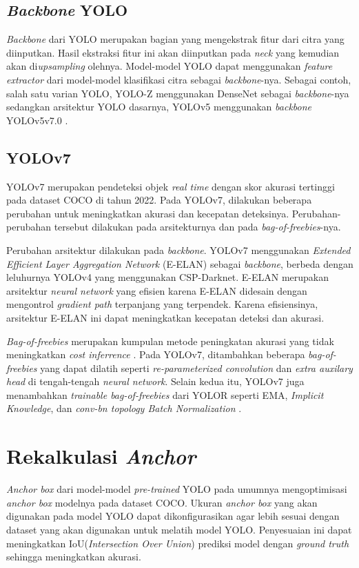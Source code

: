     \subsection{\emph{Backbone} YOLO}
      \emph{Backbone} dari YOLO merupakan bagian yang mengekstrak fitur dari citra yang diinputkan.
      Hasil ekstraksi fitur ini akan diinputkan pada \emph{neck} yang kemudian akan di\emph{upsampling} olehnya.
      Model-model YOLO dapat menggunakan \emph{feature extractor} dari model-model klasifikasi citra sebagai \emph{backbone}-nya.
      Sebagai contoh, salah satu varian YOLO, YOLO-Z menggunakan DenseNet sebagai \emph{backbone}-nya sedangkan arsitektur YOLO dasarnya, YOLOv5 menggunakan \emph{backbone} YOLOv5v7.0 \parencite{yoloz}.
  
  
  
  
  \subsection{YOLOv7}
    YOLOv7 merupakan pendeteksi objek \emph{real time} dengan skor akurasi tertinggi pada dataset COCO di tahun 2022.
    Pada YOLOv7, dilakukan beberapa perubahan untuk meningkatkan akurasi dan kecepatan deteksinya.
    Perubahan-perubahan tersebut dilakukan pada arsitekturnya dan pada \emph{bag-of-freebies}-nya.
  
    Perubahan arsitektur dilakukan pada \emph{backbone}. YOLOv7 menggunakan \emph{Extended Efficient Layer Aggregation Network} (E-ELAN) sebagai \emph{backbone}, berbeda dengan leluhurnya YOLOv4 yang menggunakan CSP-Darknet.
    E-ELAN merupakan arsitektur \emph{neural network} yang efisien karena E-ELAN didesain dengan mengontrol \emph{gradient path} terpanjang yang terpendek.
    Karena efisiensinya, arsitektur E-ELAN ini dapat meningkatkan kecepatan deteksi dan akurasi. \parencite{yolov7}
  
    \emph{Bag-of-freebies} merupakan kumpulan metode peningkatan akurasi yang tidak meningkatkan \emph{cost inferrence} \parencite{yolov4}. 
    Pada YOLOv7, ditambahkan beberapa \emph{bag-of-freebies} yang dapat dilatih seperti \emph{re-parameterized convolution} dan \emph{extra auxilary head} di tengah-tengah \emph{neural network}.
    Selain kedua itu, YOLOv7 juga menambahkan \emph{trainable bag-of-freebies} dari YOLOR seperti EMA, \emph{Implicit Knowledge}, dan \emph{conv-bn topology Batch Normalization} \parencite{yolov7}.


\section{Rekalkulasi \emph{Anchor}}
  \emph{Anchor box} dari model-model \emph{pre-trained} YOLO pada umumnya mengoptimisasi \emph{anchor box} modelnya pada dataset COCO.
  Ukuran \emph{anchor box} yang akan digunakan pada model YOLO dapat dikonfigurasikan agar lebih sesuai dengan dataset yang akan digunakan untuk melatih model YOLO.
  Penyesuaian ini dapat meningkatkan IoU(\emph{Intersection Over Union}) prediksi model dengan \emph{ground truth} sehingga meningkatkan akurasi.

